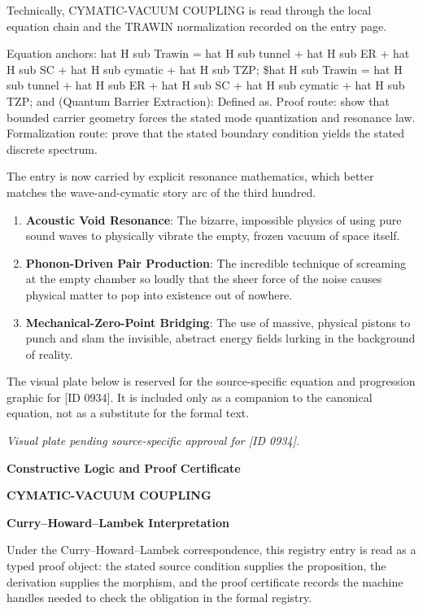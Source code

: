 Technically, CYMATIC-VACUUM COUPLING is read through the local equation chain and the TRAWIN normalization recorded on the entry page.

Equation anchors: hat H sub Trawin = hat H sub tunnel + hat H sub ER + hat H sub SC + hat H sub cymatic + hat H sub TZP; \$hat H sub Trawin = hat H sub tunnel + hat H sub ER + hat H sub SC + hat H sub cymatic + hat H sub TZP; and (Quantum Barrier Extraction): Defined as. Proof route: show that bounded carrier geometry forces the stated mode quantization and resonance law. Formalization route: prove that the stated boundary condition yields the stated discrete spectrum.

The entry is now carried by explicit resonance mathematics, which better matches the wave-and-cymatic story arc of the third hundred.
\endgroup

\begin{enumerate}[leftmargin=1.6em,itemsep=6pt,topsep=4pt]
\item \textbf{Acoustic Void Resonance}: The bizarre, impossible physics of using pure sound waves to physically vibrate the empty, frozen vacuum of space itself.
\item \textbf{Phonon-Driven Pair Production}: The incredible technique of screaming at the empty chamber so loudly that the sheer force of the noise causes physical matter to pop into existence out of nowhere.
\item \textbf{Mechanical-Zero-Point Bridging}: The use of massive, physical pistons to punch and slam the invisible, abstract energy fields lurking in the background of reality.
\end{enumerate}

\begingroup\footnotesize\sloppy
The visual plate below is reserved for the source-specific equation and progression graphic for [ID 0934]. It is included only as a companion to the canonical equation, not as a substitute for the formal text.
\par\endgroup
\begingroup\footnotesize\itshape
Visual plate pending source-specific approval for [ID 0934].
\par\endgroup

\clearpage
\begingroup\tzpsupportsetup
\noindent\textbf{\fontsize{10.8pt}{12.8pt}\selectfont [ID 0934] Constructive Logic and Proof Certificate}\par
\noindent\textbf{\fontsize{10pt}{12pt}\selectfont CYMATIC-VACUUM COUPLING}\par
\vspace{0.45em}
\begingroup
\footnotesize
\setlength{\parskip}{0.22em}
\setlength{\parindent}{0pt}
\noindent\textbf{Curry--Howard--Lambek Interpretation}\par
Under the Curry--Howard--Lambek correspondence, this registry entry is read as a typed proof
object: the stated source condition supplies the proposition, the derivation supplies the
morphism, and the proof certificate records the machine handles needed to check the obligation
in the formal registry.

